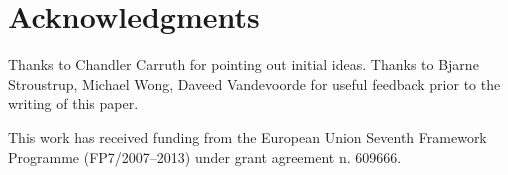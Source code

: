 \section*{Acknowledgments}

Thanks to Chandler Carruth for pointing out initial ideas. Thanks to Bjarne
Stroustrup, Michael Wong, Daveed Vandevoorde for useful feedback prior to the
writing of this paper.

This work has received funding from the European Union
Seventh Framework Programme (FP7/2007--2013) under grant agreement n.  609666.
